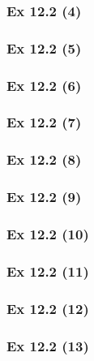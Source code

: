 \subsubsection{Ex 12.2 (4)}\label{sec:Ex_12.2.4}

\subsubsection{Ex 12.2 (5)}\label{sec:Ex_12.2.5}

\subsubsection{Ex 12.2 (6)}\label{sec:Ex_12.2.6}

\subsubsection{Ex 12.2 (7)}\label{sec:Ex_12.2.7}

\subsubsection{Ex 12.2 (8)}\label{sec:Ex_12.2.8}

\subsubsection{Ex 12.2 (9)}\label{sec:Ex_12.2.9}

\subsubsection{Ex 12.2 (10)}\label{sec:Ex_12.2.10}

\newpage		%

\subsubsection{Ex 12.2 (11)}\label{sec:Ex_12.2.11}

\subsubsection{Ex 12.2 (12)}\label{sec:Ex_12.2.12}

\subsubsection{Ex 12.2 (13)}\label{sec:Ex_12.2.13}

